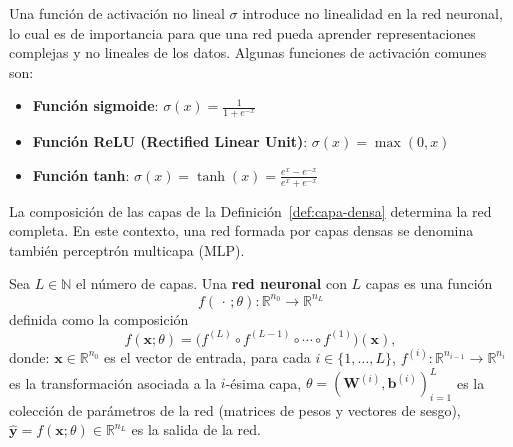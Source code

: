 \begin{observation}
\label{obs:funciones-activacion}
    Una función de activación no lineal $\sigma$ introduce no linealidad en la red neuronal, lo cual es de importancia para que una red pueda aprender representaciones complejas y no lineales de los datos.
    Algunas funciones de activación comunes son:
    \begin{itemize}
        \item \textbf{Función sigmoide}: $\sigma(x) = \frac{1}{1 + e^{-x}}$
        \item \textbf{Función ReLU (Rectified Linear Unit)}: $\sigma(x) = \max(0, x)$
        \item \textbf{Función tanh}: $\sigma(x) = \tanh(x) = \frac{e^x - e^{-x}}{e^x + e^{-x}}$
    \end{itemize}
\end{observation}

La composición de las capas de la Definición~\ref{def:capa-densa} determina la red completa. En este contexto, una red formada por capas densas se denomina también perceptrón multicapa (MLP).

\begin{definition}
\label{def:red-neuronal}
    Sea $L \in \mathbb{N}$ el número de capas. Una \textbf{red neuronal} con $L$ capas es una función
    \[
        f(\,\cdot\,;\theta) : \mathbb{R}^{n_0} \longrightarrow \mathbb{R}^{n_L}
    \]
    definida como la composición
    \[
        f(\mathbf{x};\theta) = \bigl(f^{(L)} \circ f^{(L-1)} \circ \dotsb \circ f^{(1)}\bigr)(\mathbf{x}),
    \]
    donde:
    $\mathbf{x} \in \mathbb{R}^{n_0}$ es el vector de entrada, para cada $i \in \{1,\dotsc,L\}$, $f^{(i)} : \mathbb{R}^{n_{i-1}} \to \mathbb{R}^{n_i}$ es la transformación asociada a la $i$-ésima capa, $\theta = (\mathbf{W}^{(i)}, \mathbf{b}^{(i)})_{i=1}^{L}$ es la colección de parámetros de la red (matrices de pesos y vectores de sesgo), $\hat{\mathbf{y}} = f(\mathbf{x};\theta) \in \mathbb{R}^{n_L}$ es la salida de la red.
\end{definition}

